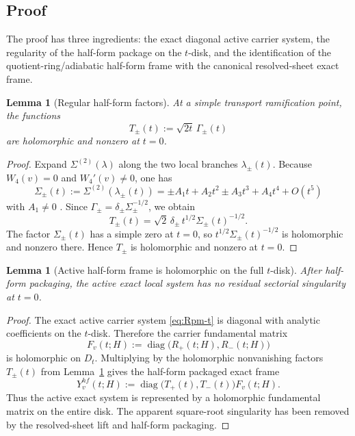 \documentclass[11pt]{article}
\numberwithin{equation}{section}
\newtheorem{lemma}[theorem]{Lemma}
\theoremstyle{definition}
\newcommand{\diag}{\operatorname{diag}}
\begin{document}
\subsection{Proof}

The proof has three ingredients: the exact diagonal active carrier system, the regularity of the half-form package on the $t$-disk, and the identification of the quotient-ring/adiabatic half-form frame with the canonical resolved-sheet exact frame.

\begin{lemma}[Regular half-form factors]
\label{lem:Tregular}
At a simple transport ramification point, the functions
\begin{equation}
\label{eq:Tpm-def}
 T_\pm(t):=\sqrt{2t}\,\Gamma_\pm(t)
\end{equation}
are holomorphic and nonzero at $t=0$.
\end{lemma}

\begin{proof}
Expand $\Sigma^{(2)}(\lambda)$ along the two local branches $\lambda_\pm(t)$. Because $W_4(v)=0$ and $W_4'(v)\neq 0$, one has
\begin{equation}
\label{eq:Sigma-expand}
 \Sigma_\pm(t):=\Sigma^{(2)}(\lambda_\pm(t))=\pm A_1 t+A_2 t^2\pm A_3 t^3+A_4 t^4+O(t^5)
\end{equation}
with $A_1\neq 0$ \cite{TransportPhase}. Since $\Gamma_\pm=\delta_\pm\Sigma_\pm^{-1/2}$, we obtain
\[
T_\pm(t)=\sqrt{2}\,\delta_\pm\,t^{1/2}\Sigma_\pm(t)^{-1/2}.
\]
The factor $\Sigma_\pm(t)$ has a simple zero at $t=0$, so $t^{1/2}\Sigma_\pm(t)^{-1/2}$ is holomorphic and nonzero there. Hence $T_\pm$ is holomorphic and nonzero at $t=0$.
\end{proof}

\begin{lemma}[Active half-form frame is holomorphic on the full $t$-disk]
\label{lem:holomorphic-frame}
After half-form packaging, the active exact local system has no residual sectorial singularity at $t=0$.
\end{lemma}

\begin{proof}
The exact active carrier system \eqref{eq:Rpm-t} is diagonal with analytic coefficients on the $t$-disk. Therefore the carrier fundamental matrix
\begin{equation}
\label{eq:carrier-matrix}
F_v(t;H):=\diag\bigl(R_+(t;H),R_-(t;H)\bigr)
\end{equation}
is holomorphic on $D_t$. Multiplying by the holomorphic nonvanishing factors $T_\pm(t)$ from Lemma~\ref{lem:Tregular} gives the half-form packaged exact frame
\begin{equation}
\label{eq:half-form-frame}
Y_v^{hf}(t;H):=\diag\bigl(T_+(t),T_-(t)\bigr)F_v(t;H).
\end{equation}
Thus the active exact system is represented by a holomorphic fundamental matrix on the entire disk. The apparent square-root singularity has been removed by the resolved-sheet lift and half-form packaging.
\end{proof}
\end{document}
